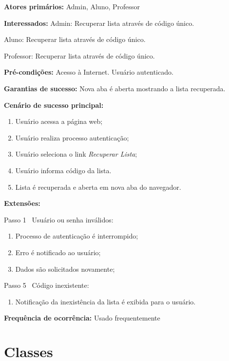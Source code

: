 \documentclass[12pt,oneside,a4paper,article]{abntex2}
\begin{document}
		\textbf{Atores primários:} Admin, Aluno, Professor
		
		\textbf{Interessados:} Admin: Recuperar lista através de código único.
		
		Aluno: Recuperar lista através de código único.
		
		Professor: Recuperar lista através de código único.
		
		\textbf{Pré-condições:} Acesso à Internet. Usuário autenticado.
		
		\textbf{Garantias de sucesso:} Nova aba é aberta mostrando a lista recuperada.
		
		\textbf{Cenário de sucesso principal:} 
		
		\begin{enumerate}
			\item Usuário acessa a página web;
			
			\item Usuário realiza processo autenticação;
			
			\item Usuário seleciona o link \textit{Recuperar Lista};
			
			\item Usuário informa código da lista.
			
			\item Lista é recuperada e aberta em nova aba do navegador.			
		\end{enumerate}
		
		\textbf{Extensões:} 
		
		Passo 1 \textrightarrow \ Usuário ou senha inválidos:
		
		\begin{enumerate}[label=\alph*.]	
			\item Processo de autenticação é interrompido;
			\item Erro é notificado ao usuário;
			\item Dados são solicitados novamente;
		\end{enumerate}
		
		Passo 5 \textrightarrow \ Código inexistente:
		
		\begin{enumerate}[label=\alph*.]	
			\item Notificação da inexistência da lista é exibida para o usuário.
		\end{enumerate}
		
		\textbf{Frequência de ocorrência:} Usado frequentemente
		

\part{Classes}
\end{document}
